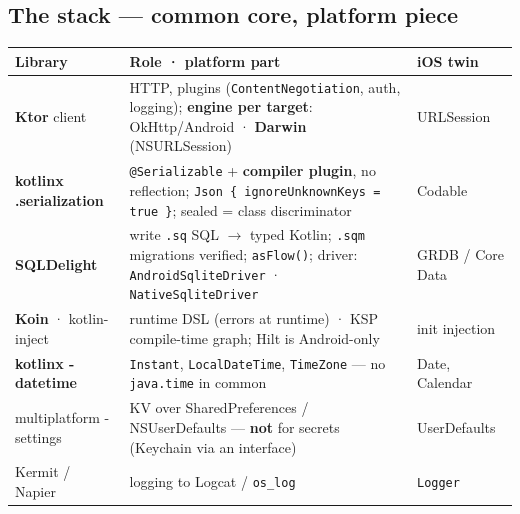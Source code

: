 \documentclass[8pt]{extarticle}
\begin{document}
\begin{multicols}{2}
\raggedright

\section{The stack — common core, platform piece}
{\scriptsize
\noindent\begin{tabularx}{\linewidth}{@{}>{\raggedright\arraybackslash}p{18mm}L>{\raggedright\arraybackslash}p{15mm}@{}}
\toprule
\textbf{Library} & \textbf{Role · platform part} & \textbf{iOS twin} \\
\midrule
\textbf{Ktor} client & HTTP, plugins (\texttt{ContentNegotiation}, auth, logging);
  \textbf{engine per target}: OkHttp/Android · \textbf{Darwin} (NSURLSession) &
  URLSession \\
\textbf{kotlinx .serialization} & \texttt{@Serializable} + \textbf{compiler plugin}, no
  reflection; \texttt{Json \{ ignoreUnknownKeys = true \}}; sealed = class discriminator &
  Codable \\
\textbf{SQLDelight} & write \texttt{.sq} SQL $\to$ typed Kotlin; \texttt{.sqm} migrations
  verified; \texttt{asFlow()}; driver: \texttt{AndroidSqliteDriver} ·
  \texttt{NativeSqliteDriver} & GRDB / Core Data \\
\textbf{Koin} · kotlin-inject & runtime DSL (errors at runtime) · KSP compile-time
  graph; Hilt is Android-only & init injection \\
\textbf{kotlinx -datetime} & \texttt{Instant}, \texttt{LocalDateTime}, \texttt{TimeZone} —
  no \texttt{java.time} in common & Date, Calendar \\
multiplatform -settings & KV over SharedPreferences / NSUserDefaults — \textbf{not} for
  secrets (Keychain via an interface) & UserDefaults \\
Kermit / Napier & logging to Logcat / \texttt{os\_log} & \texttt{Logger} \\
\bottomrule
\end{tabularx}}


\end{multicols}
\end{document}
